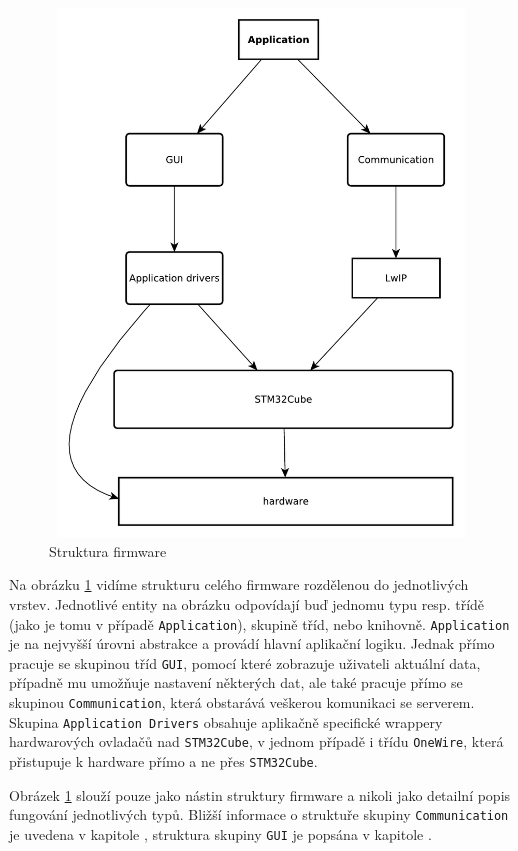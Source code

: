 \begin{figure}[tbh]\centering
\includegraphics[width=140mm, height=140mm]{../diagrams/stm_fw_struktura.pdf}
\caption{Struktura firmware}
\label{stm-fw-struktura}
\end{figure}

Na obrázku \ref{stm-fw-struktura} vidíme strukturu celého firmware rozdělenou do jednotlivých vrstev.
Jednotlivé entity na obrázku odpovídají buď jednomu typu resp. třídě (jako je tomu v případě \texttt{Application}),
skupině tříd, nebo knihovně.
\texttt{Application} je na nejvyšší úrovni abstrakce a provádí hlavní aplikační logiku.
Jednak přímo pracuje se skupinou tříd \texttt{GUI}, pomocí které zobrazuje uživateli aktuální data,
případně mu umožňuje nastavení některých dat, ale také pracuje přímo se skupinou \texttt{Communication},
která obstarává veškerou komunikaci se serverem.
Skupina \texttt{Application Drivers} obsahuje aplikačně specifické wrappery hardwarových ovladačů nad
\texttt{STM32Cube}, v jednom případě i třídu \texttt{OneWire}, která přistupuje k hardware přímo
a ne přes \texttt{STM32Cube}.

Obrázek \ref{stm-fw-struktura} slouží pouze jako nástin struktury firmware a nikoli jako detailní popis
fungování jednotlivých typů.
Bližší informace o struktuře skupiny \texttt{Communication} je uvedena v kapitole ,
struktura skupiny \texttt{GUI} je popsána v kapitole .

